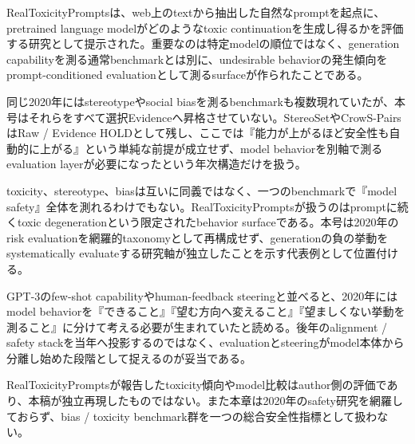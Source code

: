 
RealToxicityPromptsは、web上のtextから抽出した自然なpromptを起点に、pretrained language modelがどのようなtoxic continuationを生成し得るかを評価する研究として提示された。重要なのは特定modelの順位ではなく、generation capabilityを測る通常benchmarkとは別に、undesirable behaviorの発生傾向をprompt-conditioned evaluationとして測るsurfaceが作られたことである。\autocite{src-308178e74f55}


同じ2020年にはstereotypeやsocial biasを測るbenchmarkも複数現れていたが、本号はそれらをすべて選択Evidenceへ昇格させていない。StereoSetやCrowS-PairsはRaw / Evidence HOLDとして残し、ここでは『能力が上がるほど安全性も自動的に上がる』という単純な前提が成立せず、model behaviorを別軸で測るevaluation layerが必要になったという年次構造だけを扱う。\autocite{src-308178e74f55}


toxicity、stereotype、biasは互いに同義ではなく、一つのbenchmarkで『model safety』全体を測れるわけでもない。RealToxicityPromptsが扱うのはpromptに続くtoxic degenerationという限定されたbehavior surfaceである。本号は2020年のrisk evaluationを網羅的taxonomyとして再構成せず、generationの負の挙動をsystematically evaluateする研究軸が独立したことを示す代表例として位置付ける。\autocite{src-308178e74f55}


GPT-3のfew-shot capabilityやhuman-feedback steeringと並べると、2020年にはmodel behaviorを『できること』『望む方向へ変えること』『望ましくない挙動を測ること』に分けて考える必要が生まれていたと読める。後年のalignment / safety stackを当年へ投影するのではなく、evaluationとsteeringがmodel本体から分離し始めた段階として捉えるのが妥当である。\autocite{src-308178e74f55}


\begin{claimboundary}
RealToxicityPromptsが報告したtoxicity傾向やmodel比較はauthor側の評価であり、本稿が独立再現したものではない。また本章は2020年のsafety研究を網羅しておらず、bias / toxicity benchmark群を一つの総合安全性指標として扱わない。\autocite{src-308178e74f55}
\end{claimboundary}
